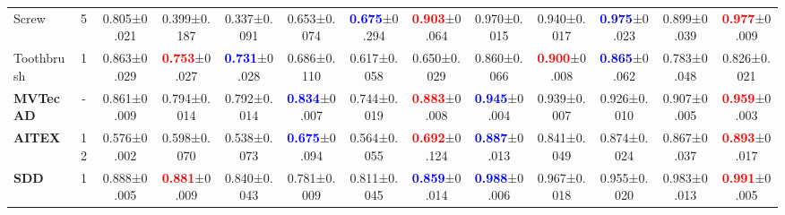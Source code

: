 \documentclass[10pt,twocolumn,letterpaper]{article}
\begin{document}
\begin{table*}[bt]
{\begin{tabular}{l@{}|c ||c||ccccc||ccccc}
    Screw & 5& 0.805\footnotesize{±0.021}& 0.399\footnotesize{±0.187}& 0.337\footnotesize{±0.091}& 0.653\footnotesize{±0.074}& \textcolor{blue}{\textbf{0.675}}\footnotesize{±0.294}& \textcolor{red}{\textbf{0.903}}\footnotesize{±0.064}& 0.970\footnotesize{±0.015}& 0.940\footnotesize{±0.017}& \textcolor{blue}{\textbf{0.975}}\footnotesize{±0.023}& 0.899\footnotesize{±0.039}& \textcolor{red}{\textbf{0.977}}\footnotesize{±0.009} \\
    
    Toothbrush & 1 & 0.863\footnotesize{±0.029}& \textcolor{red}{\textbf{0.753}}\footnotesize{±0.027}& \textcolor{blue}{\textbf{0.731}}\footnotesize{±0.028}& 0.686\footnotesize{±0.110}& 0.617\footnotesize{±0.058}& 0.650\footnotesize{±0.029}& 0.860\footnotesize{±0.066}& \textcolor{red}{\textbf{0.900}}\footnotesize{±0.008}& \textcolor{blue}{\textbf{0.865}}\footnotesize{±0.062}& 0.783\footnotesize{±0.048}& 0.826\footnotesize{±0.021} \\
    
    \hline
    \textbf{MVTec AD} & - & 0.861\footnotesize{±0.009}& 0.794\footnotesize{±0.014}& 0.792\footnotesize{±0.014}& \textcolor{blue}{\textbf{0.834}}\footnotesize{±0.007}& 0.744\footnotesize{±0.019}& \textcolor{red}{\textbf{0.883}}\footnotesize{±0.008}& \textcolor{blue}{\textbf{0.945}}\footnotesize{±0.004}& 0.939\footnotesize{±0.007}& 0.926\footnotesize{±0.010}& 0.907\footnotesize{±0.005}& \textcolor{red}{\textbf{0.959}}\footnotesize{±0.003} \\
    
    \textbf{AITEX } &12& 0.576\footnotesize{±0.002}& 0.598\footnotesize{±0.070}& 0.538\footnotesize{±0.073}& \textcolor{blue}{\textbf{0.675}}\footnotesize{±0.094}& 0.564\footnotesize{±0.055}& \textcolor{red}{\textbf{0.692}}\footnotesize{±0.124}& \textcolor{blue}{\textbf{0.887}}\footnotesize{±0.013}& 0.841\footnotesize{±0.049}& 0.874\footnotesize{±0.024}& 0.867\footnotesize{±0.037}& \textcolor{red}{\textbf{0.893}}\footnotesize{±0.017} \\
    
    \textbf{SDD}& 1 & 0.888\footnotesize{±0.005}& \textcolor{red}{\textbf{0.881}}\footnotesize{±0.009}& 0.840\footnotesize{±0.043}& 0.781\footnotesize{±0.009}& 0.811\footnotesize{±0.045}& \textcolor{blue}{\textbf{0.859}}\footnotesize{±0.014}& \textcolor{blue}{\textbf{0.988}}\footnotesize{±0.006}& 0.967\footnotesize{±0.018}& 0.955\footnotesize{±0.020}& 0.983\footnotesize{±0.013}& \textcolor{red}{\textbf{0.991}}\footnotesize{±0.005} \\
    

\end{tabular}}
\end{table*}
\end{document}
